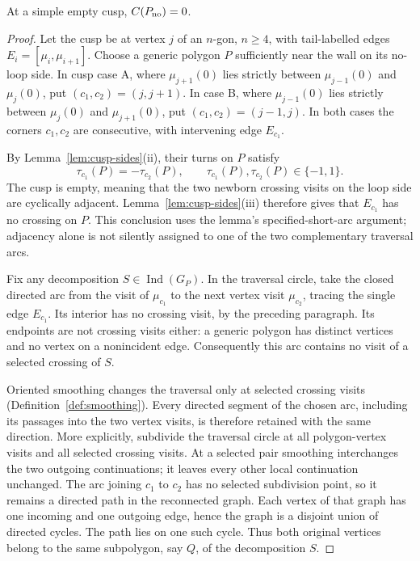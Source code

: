 \begin{theorem}\label{thm:C-S5}\leanok
At a simple empty cusp, $C(P_{\rm no})=0$.

\end{theorem}
\begin{proof}\leanok{}
Let the cusp be at vertex $j$ of an $n$-gon, $n\geq4$, with tail-labelled
edges $E_i=[\mu_i,\mu_{i+1}]$. Choose a generic polygon $P$ sufficiently
near the wall on its no-loop side. In cusp case A, where
$\mu_{j+1}(0)$ lies strictly between $\mu_{j-1}(0)$ and $\mu_j(0)$,
put $(c_1,c_2)=(j,j+1)$. In case B, where $\mu_{j-1}(0)$ lies strictly
between $\mu_j(0)$ and $\mu_{j+1}(0)$, put $(c_1,c_2)=(j-1,j)$.
In both cases the corners $c_1,c_2$ are consecutive, with intervening
edge $E_{c_1}$.

By Lemma~\ref{lem:cusp-sides}(ii), their turns on $P$ satisfy
\begin{equation}\label{s5pr:opposed-turns}
\tau_{c_1}(P)=-\tau_{c_2}(P),\qquad
\tau_{c_1}(P),\tau_{c_2}(P)\in\{-1,1\}.
\end{equation}
The cusp is empty, meaning that the two newborn crossing visits on the
loop side are cyclically adjacent. Lemma~\ref{lem:cusp-sides}(iii)
therefore gives that $E_{c_1}$ has no crossing on $P$. This conclusion
uses the lemma's specified-short-arc argument; adjacency alone is not
silently assigned to one of the two complementary traversal arcs.

Fix any decomposition $S\in\operatorname{Ind}(G_P)$.
In the traversal circle, take the closed directed arc from the visit
of $\mu_{c_1}$ to the next vertex visit $\mu_{c_2}$, tracing the single
edge $E_{c_1}$. Its interior has no crossing visit, by the preceding
paragraph. Its endpoints are not crossing visits either: a generic
polygon has distinct vertices and no vertex on a nonincident edge.
Consequently this arc contains no visit of a selected crossing of $S$.

Oriented smoothing changes the traversal only at selected crossing
visits (Definition~\ref{def:smoothing}). Every directed segment of the
chosen arc, including its passages into the two vertex visits, is
therefore retained with the same direction. More explicitly, subdivide
the traversal circle at all polygon-vertex visits and all selected
crossing visits. At a selected pair smoothing interchanges the two
outgoing continuations; it leaves every other local continuation
unchanged. The arc joining $c_1$ to $c_2$ has no selected subdivision
point, so it remains a directed path in the reconnected graph. Each
vertex of that graph has one incoming and one outgoing edge, hence the
graph is a disjoint union of directed cycles. The path lies on one
such cycle. Thus both original vertices belong to the same subpolygon,
say $Q$, of the decomposition $S$.


\end{proof}

